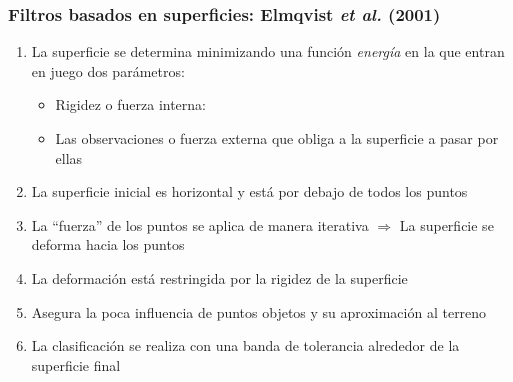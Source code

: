 \begin{frame}
  \frametitle{Filtros basados en superficies: Elmqvist \emph{et al.} (2001)}
  \begin{enumerate}
    \item La superficie se determina minimizando una función
      \alert{\emph{energía}} en la que entran en juego dos parámetros:
      \begin{itemize}
        \item \alert{Rigidez} o fuerza interna:
        \item Las observaciones o fuerza externa que obliga a la superficie a
          pasar por ellas
      \end{itemize}
     \item La superficie inicial es horizontal y está por debajo de todos los
       puntos
     \item La ``fuerza'' de los puntos se aplica de manera iterativa
       $\Rightarrow$ La superficie se deforma hacia los puntos
     \item La deformación está restringida por la rigidez de la superficie
     \item Asegura la poca influencia de puntos objetos y su aproximación al
       terreno
     \item La clasificación se realiza con una banda de tolerancia alrededor de
       la superficie final
  \end{enumerate}
\end{frame}
